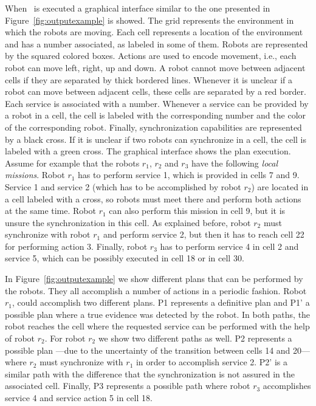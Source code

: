 When  \toolName\ is executed a graphical interface similar to the one presented  in Figure~\ref{fig:outputexample} is showed.
The grid represents the environment in which the robots are moving.
Each cell represents a location of the environment and has a number associated, as labeled in some of them.
Robots are represented by the squared colored boxes.
Actions are used to encode movement, i.e., each robot can move left, right, up and down.
A robot  cannot move between adjacent cells if they are separated by thick bordered lines.
Whenever  it is unclear if a robot can move between adjacent cells, these cells are separated by a red border.
Each service is associated with a number.
Whenever a service can be provided by a robot in a cell, the cell is labeled with the corresponding number and the color of the corresponding robot.
Finally, synchronization capabilities are represented by a black cross.
If it is unclear if two robots can synchronize in a cell, the cell is labeled with a green cross.
The graphical interface shows the plan execution.
Assume for example that the robots $r_1$, $r_2$ and $r_3$ have the following \emph{local missions}.
Robot $r_1$ has to perform service 1, which is provided in cells 7 and 9.
Service 1 and service 2 (which has to be accomplished by robot $r_2$) are located in a cell labeled with a cross, so robots must meet there and perform both actions at the same time.
Robot $r_1$ can also perform this mission in cell 9, but it is unsure the synchronization in this cell.
As explained before, robot $r_2$ must synchronize with robot $r_1$ and perform service 2, but then it has to reach cell 22 for performing action 3.
Finally, robot $r_3$ has to perform service 4 in cell 2 and service 5, which can be possibly executed in cell 18 or in cell 30.

In Figure~\ref{fig:outputexample} we show different plans that can be performed by the robots. 
They all accomplish a number of actions in a periodic fashion.
Robot $r_1$, could accomplish two different plans.
P1 represents a definitive plan and P1' a possible plan where a true evidence was detected by the robot.
In both paths, the robot reaches the cell where the requested service can be performed with the help of robot $r_2$.
For robot $r_2$ we show two different paths as well.
P2 represents a possible plan ---due to the uncertainty of the transition between cells 14 and 20--- where $r_2$ must synchronize with $r_1$ in order to accomplish service 2.
P2' is a similar path with the difference that the synchronization is not assured in the associated cell.
Finally, P3 represents a possible path where robot $r_3$ accomplishes service 4 and service action 5 in cell 18.

